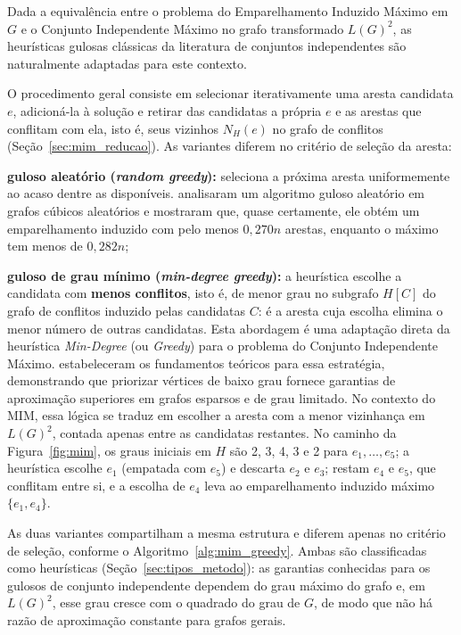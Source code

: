 Dada a equivalência entre o problema do Emparelhamento Induzido Máximo em $G$ e o Conjunto Independente Máximo no grafo transformado $L(G)^2$, as heurísticas gulosas clássicas da literatura de conjuntos independentes são naturalmente adaptadas para este contexto.

O procedimento geral consiste em selecionar iterativamente uma aresta candidata $e$, adicioná-la à solução e retirar das candidatas a própria $e$ e as arestas que conflitam com ela, isto é, seus vizinhos $N_H(e)$ no grafo de conflitos (Seção~\ref{sec:mim_reducao}). As variantes diferem no critério de seleção da aresta:

\begin{alineas}
    \item \textbf{guloso aleatório (\textit{random greedy}):} seleciona a próxima aresta uniformemente ao acaso dentre as disponíveis.  analisaram um algoritmo guloso aleatório em grafos cúbicos aleatórios e mostraram que, quase certamente, ele obtém um emparelhamento induzido com pelo menos $0{,}270n$ arestas, enquanto o máximo tem menos de $0{,}282n$;
    \item \textbf{guloso de grau mínimo (\textit{min-degree greedy}):} a heurística escolhe a candidata com \textbf{menos conflitos}, isto é, de menor grau no subgrafo $H[C]$ do grafo de conflitos induzido pelas candidatas $C$: é a aresta cuja escolha elimina o menor número de outras candidatas. Esta abordagem é uma adaptação direta da heurística \textit{Min-Degree} (ou \textit{Greedy}) para o problema do Conjunto Independente Máximo.
     estabeleceram os fundamentos teóricos para essa estratégia, demonstrando que priorizar vértices de baixo grau fornece garantias de aproximação superiores em grafos esparsos e de grau limitado. No contexto do MIM, essa lógica se traduz em escolher a aresta com a menor vizinhança em $L(G)^2$, contada apenas entre as candidatas restantes. No caminho da Figura~\ref{fig:mim}, os graus iniciais em $H$ são 2, 3, 4, 3 e 2 para $e_1, \ldots, e_5$; a heurística escolhe $e_1$ (empatada com $e_5$) e descarta $e_2$ e $e_3$; restam $e_4$ e $e_5$, que conflitam entre si, e a escolha de $e_4$ leva ao emparelhamento induzido máximo $\{e_1, e_4\}$.
\end{alineas}

As duas variantes compartilham a mesma estrutura e diferem apenas no critério de seleção, conforme o Algoritmo~\ref{alg:mim_greedy}. Ambas são classificadas como heurísticas (Seção~\ref{sec:tipos_metodo}): as garantias conhecidas para os gulosos de conjunto independente dependem do grau máximo do grafo \cite{halldorsson} e, em $L(G)^2$, esse grau cresce com o quadrado do grau de $G$, de modo que não há razão de aproximação constante para grafos gerais.


